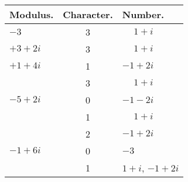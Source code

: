 \documentclass[twoside,12pt]{memoir}
\begin{document}
\begin{center}
\begin{tabular}{l|c|l}
Modulus. & Character. & Number. \\
\hline
\(-3\) & 3 & \(\phantom{+}1+i\) \\
\(+3+2 i\) & 3 & \(\phantom{+}1+i\) \\
\(+1+4 i\) & 1 & \(-1+2 i\) \\
 & 3 & \(\phantom{+}1+i\) \\
\(-5+2 i\)& 0 & \(-1-2 i\) \\
 & 1 & \(\phantom{+}1+i\) \\
& 2 & \(-1+2 i\) \\
\(-1+6 i\) & 0 & \(-3\) \\
 &1&\(1+i\), \(-1+2i\)
\end{tabular}\pagebreak%


\end{center}
\end{document}
